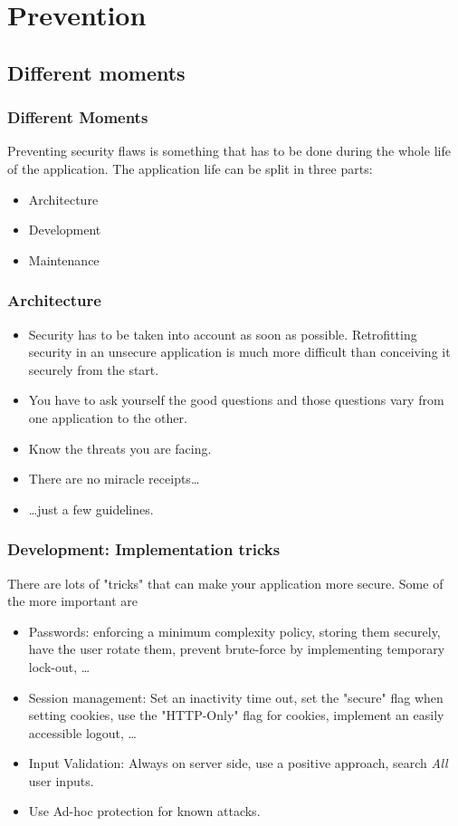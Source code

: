 \section{Prevention}
\subsection{Different moments}
\begin{frame}
\frametitle{Different Moments}

Preventing security flaws is something that has to be done during the
whole life of the application. The application life can be split in
three parts:

\begin{itemize}
\item Architecture
\item Development
\item Maintenance
\end{itemize}
\end{frame}

\begin{frame}
\frametitle{Architecture}
\begin{itemize}
\item Security has to be taken into account as soon as
  possible. Retrofitting security in an unsecure application is much
  more difficult than conceiving it securely from the start.
\item You have to ask yourself the good questions and those questions
  vary from one application to the other.
\item Know the threats you are facing.
\item There are no miracle receipts\ldots
\item \ldots just a few guidelines.
\end{itemize}
\end{frame}

\begin{frame}
\frametitle{Development: Implementation tricks}

There are lots of "tricks" that can make your application more
secure. Some of the more important are

\begin{itemize}
\item Passwords: enforcing a minimum complexity policy, storing them
  securely, have the user rotate them, prevent brute-force by
  implementing temporary lock-out, \ldots
\item Session management: Set an inactivity time out, set the
  "secure" flag when setting cookies, use the "HTTP-Only" flag for
  cookies, implement an easily accessible logout, \ldots
\item Input Validation: Always on server side, use a positive
  approach, search \emph{All} user inputs.
\item Use Ad-hoc protection for known attacks.
\end{itemize}
\end{frame}

